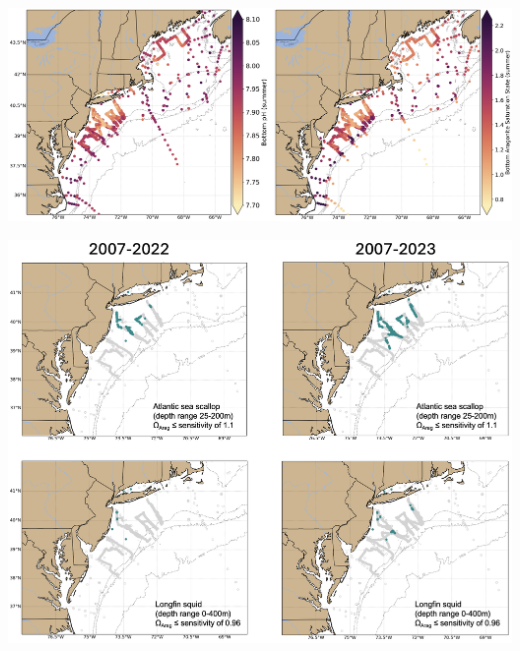 \documentclass[
  10pt,
]{article}
\let\origfigure\figure
\let\endorigfigure\endfigure
\renewenvironment{figure}[1][2] {
    \expandafter\origfigure\expandafter[H]
} {
    \endorigfigure
}
\begin{document}
\begin{figure}

{\centering \includegraphics[width=1\linewidth]{SOE-NEFMC_files/figure-latex/mab-oa-1} 

}

\caption{Bottom summer-time (June-August) pH (left panel) and aragonite saturation state (right panel) on the U.S. Northeast Shelf from 2007-2023 plotted from available quality-controlled vessel- and glider-based datasets.}\label{fig:mab-oa}
\end{figure}

\begin{figure}

{\centering \includegraphics[width=1\linewidth]{SOE-NEFMC_files/figure-latex/oa-spp-1} 

}

\caption{Locations where bottom aragonite saturation state ($\Omega_{Arag}$; summer only: June-August) were at or below the laboratory-derived sensitivity level for Atlantic sea scallop (top panels) and longfin squid (bottom panels) for the time periods 2007-2022 (left panels) and 2007-2023 (right panels). Gray circles indicate locations where carbonate chemistry samples were collected, but bottom $\Omega_{Arag}$ values were higher than sensitivity values determined for that species.}\label{fig:oa-spp}
\end{figure}
\end{document}
